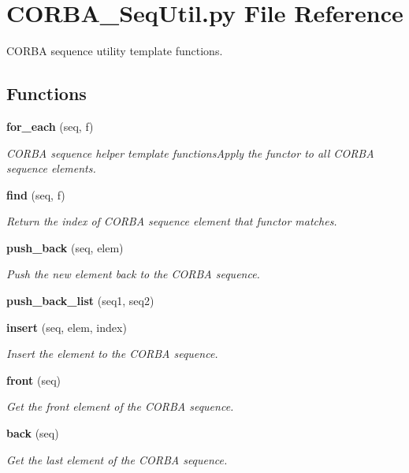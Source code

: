 \section{CORBA\_\-Seq\-Util.py File Reference}
\label{CORBA__SeqUtil_8py}
CORBA sequence utility template functions. 

\subsection*{Functions}
\begin{CompactItemize}
\item 
{\bf for\_\-each} (seq, f)
\begin{CompactList}\small\item\em CORBA sequence helper template functions\-Apply the functor to all CORBA sequence elements. \item\end{CompactList}\item 
{\bf find} (seq, f)
\begin{CompactList}\small\item\em Return the index of CORBA sequence element that functor matches. \item\end{CompactList}\item 
{\bf push\_\-back} (seq, elem)
\begin{CompactList}\small\item\em Push the new element back to the CORBA sequence. \item\end{CompactList}\item 
{\bf push\_\-back\_\-list} (seq1, seq2)
\item 
{\bf insert} (seq, elem, index)
\begin{CompactList}\small\item\em Insert the element to the CORBA sequence. \item\end{CompactList}\item 
{\bf front} (seq)
\begin{CompactList}\small\item\em Get the front element of the CORBA sequence. \item\end{CompactList}\item 
{\bf back} (seq)
\begin{CompactList}\small\item\em Get the last element of the CORBA sequence. \item\end{CompactList}\item 

\end{CompactItemize}
